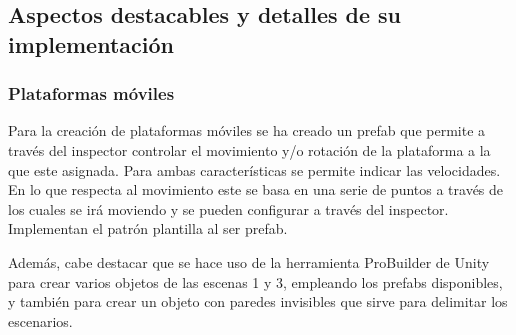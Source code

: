 \subsection{Aspectos destacables y detalles de su implementación}

\subsubsection{Plataformas móviles}
Para la creación de plataformas móviles se ha creado un prefab que permite a través del inspector controlar el movimiento y/o rotación de la plataforma a la que este asignada. Para ambas características se permite indicar las velocidades. En lo que respecta al movimiento este se basa en una serie de puntos a través de los cuales se irá moviendo y se pueden configurar a través del inspector. Implementan el patrón plantilla al ser prefab.

Además, cabe destacar que se hace uso de la herramienta ProBuilder de Unity para crear varios objetos de las escenas 1 y 3, empleando los prefabs disponibles, y también para crear un objeto con paredes invisibles que sirve para delimitar los escenarios.
